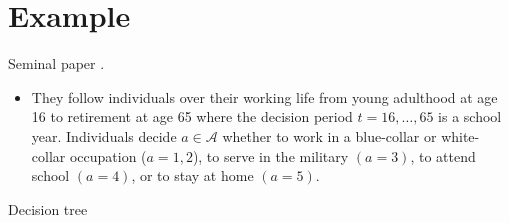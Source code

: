 \section{Example}
\begin{frame}{Seminal paper}\vspace{0.75cm}
.\vspace{0.5cm}

\begin{itemize}
	\item They follow individuals over their working life from young adulthood at age 16 to retirement at age 65 where the decision period $t = 16, \dots, 65$  is a school year. Individuals decide $a\in\mathcal{A}$ whether to work in a blue-collar or white-collar occupation ($a = 1, 2$), to serve in the military $(a = 3)$, to attend school $(a = 4)$, or to stay at home $(a = 5)$.
\end{itemize}


\end{frame}
\begin{frame}{Decision tree}

\begin{figure}
  \scalebox{0.60}{}
\end{figure}
\end{frame}

